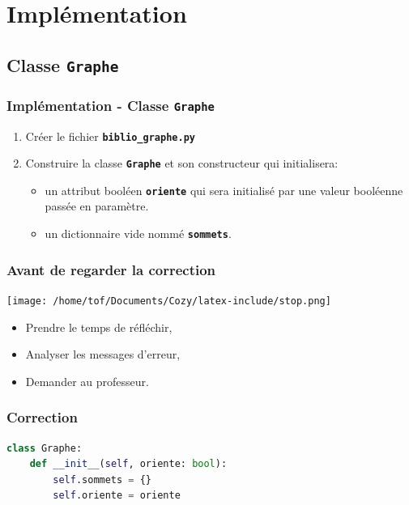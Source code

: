 \documentclass[svgnames,11pt]{beamer}
\begin{document}
\section{Implémentation}
\subsection{Classe \textbf{\texttt{Graphe}}}
\begin{frame}
    \frametitle{Implémentation - Classe \textbf{\texttt{Graphe}}}

\begin{activite}
\begin{enumerate}
    \item Créer le fichier \textbf{\texttt{biblio\_graphe.py}}
    \item Construire la classe \textbf{\texttt{Graphe}} et son constructeur qui initialisera:
    \begin{itemize}
        \item un attribut booléen \textbf{\texttt{oriente}} qui sera initialisé par une valeur booléenne passée en paramètre.
        \item un dictionnaire vide nommé \textbf{\texttt{sommets}}.
    \end{itemize} 
\end{enumerate}
\end{activite}

\end{frame}
\begin{frame}
    \frametitle{Avant de regarder la correction}
\begin{center}
    \centering
    \texttt{[image: /home/tof/Documents/Cozy/latex-include/stop.png]}
    \end{center}
{\Large
    \begin{itemize}
        \item Prendre le temps de réfléchir,
        \item Analyser les messages d'erreur,
        \item Demander au professeur.
    \end{itemize}
}
\end{frame}
\begin{frame}[fragile]
    \frametitle{Correction}
\begin{center}
\begin{lstlisting}[language=Python , basicstyle=\ttfamily\small, xleftmargin=1.5em, xrightmargin=2em]
class Graphe:
    def __init__(self, oriente: bool):
        self.sommets = {}
        self.oriente = oriente
\end{lstlisting}
\end{center}
    

\end{frame}
\end{document}
